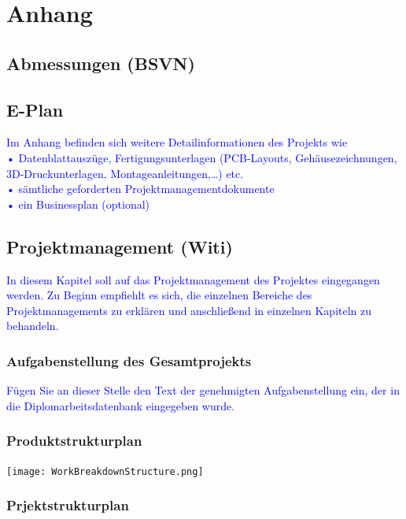 \section{Anhang}

\subsection{Abmessungen (BSVN)}

\subsection{E-Plan}

\textcolor{blue}{Im Anhang befinden sich weitere Detailinformationen des Projekts wie\\
•	Datenblattauszüge, Fertigungsunterlagen (PCB-Layouts, Gehäusezeichnungen, 3D-Druckunterlagen, Montageanleitungen,…) etc.\\
•	sämtliche geforderten Projektmanagementdokumente\\
•	ein Businessplan (optional)
}

\subsection{Projektmanagement (Witi)}
\textcolor{blue}{In diesem Kapitel soll auf das Projektmanagement des Projektes eingegangen werden. Zu Beginn empfiehlt es sich, die einzelnen Bereiche des Projektmanagements zu erklären und anschließend in einzelnen Kapiteln zu behandeln.}

\subsubsection{Aufgabenstellung des Gesamtprojekts}
\textcolor{blue}{Fügen Sie an dieser Stelle den Text der genehmigten Aufgabenstellung ein, der in die Diplomarbeitsdatenbank  eingegeben wurde.}

\subsubsection{Produktstrukturplan}
\vspace{5mm}

\bgroup
    \centering
    \texttt{[image: WorkBreakdownStructure.png]}
\egroup

\subsubsection{Prjektstrukturplan}
\vspace{5mm}

